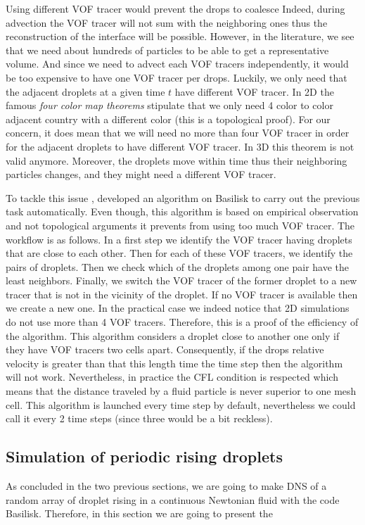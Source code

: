 Using different VOF tracer would prevent the drops to coalesce 
Indeed, during advection the VOF tracer will not sum with the neighboring ones thus the reconstruction of the interface will be possible. 
However, in the literature, we see that we need about hundreds of particles to be able to get a representative volume. 
And since we need to advect each VOF tracers independently, it would be too expensive to have one VOF tracer per drops.    
Luckily, we only need that the adjacent droplets at a given time $t$ have different VOF tracer. 
In 2D the famous \textit{four color map theorems} stipulate that we only need 4 color to color adjacent country with a different color (this is a topological proof).
For our concern, it does mean that we will need no more than four VOF tracer in order for the adjacent droplets to have different VOF tracer. 
In 3D this theorem is not valid anymore. 
Moreover, the droplets move within time thus their neighboring particles changes, and they might need a different VOF tracer.

To tackle this issue \citet{mani2021numerical}, developed an algorithm on Basilisk to carry out the previous task automatically. 
Even though, this algorithm is based on empirical observation and not topological arguments it prevents from using too much VOF tracer. 
The workflow is as follows.
In a first step we identify the VOF tracer having droplets that are close to each other. 
Then for each of these VOF tracers, we identify the pairs of droplets. 
Then we check which of the droplets among one pair have the least neighbors. 
Finally, we switch the VOF tracer of the former droplet to a new tracer that is not in the vicinity of the droplet. 
If no VOF tracer is available then we create a new one. 
In the practical case we indeed notice that 2D simulations do not use more than 4 VOF tracers. 
Therefore, this is a proof of the efficiency of the algorithm. 
This algorithm considers a droplet close to another one only if they have VOF tracers two cells apart.
Consequently, if the drops relative velocity is greater than that this length time the time step then the algorithm will not work.
Nevertheless, in practice the CFL condition is respected which means that the distance traveled by a fluid particle is never superior to one mesh cell. 
This algorithm is launched every time step by default, nevertheless we could call it every 2 time steps (since three would be a bit reckless). 
\subsection{Simulation of periodic rising droplets}
As concluded in the two previous sections, we are going to make DNS of a random array of droplet rising in a continuous Newtonian fluid with the code Basilisk. 
Therefore, in this section we are going to present the 


